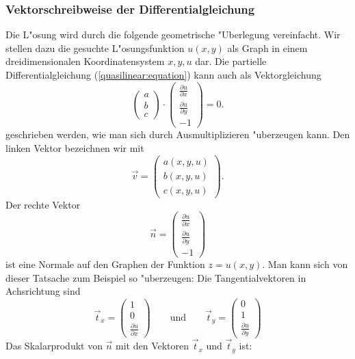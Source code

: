 \subsubsection{Vektorschreibweise der Differentialgleichung}
Die L"osung wird durch die folgende geometrische "Uberlegung vereinfacht.
Wir stellen dazu die gesuchte L"osungsfunktion $u(x,y)$ als Graph
in einem dreidimensionalen Koordinatensystem $x,y,u$ dar.
Die partielle Differentialgleichung (\ref{quasilinear:equation})
kann auch als Vektorgleichung
\begin{equation}
\begin{pmatrix}a\\b\\c\end{pmatrix}
\cdot
\begin{pmatrix}
\frac{\partial u}{\partial x}\\
\frac{\partial u}{\partial y}\\
-1
\end{pmatrix}
=0.
\label{quasilinear:vektorform}
\end{equation}
geschrieben werden, wie man sich durch Ausmultiplizieren "uberzeugen
kann.
Den linken Vektor bezeichnen wir mit
\[
\vec v=\begin{pmatrix}
a(x,y,u)\\
b(x,y,u)\\
c(x,y,u)
\end{pmatrix}.
\]
Der rechte Vektor
\[
\vec n=
\begin{pmatrix}
\frac{\partial u}{\partial x}\\
\frac{\partial u}{\partial y}\\
-1
\end{pmatrix}
\]
ist eine Normale auf den Graphen der Funktion
$z=u(x,y)$. Man kann sich von dieser Tatsache zum Beispiel so 
"uberzeugen: Die Tangentialvektoren in Achsrichtung sind
\[
\vec t_x
=
\begin{pmatrix}1\\0\\\frac{\partial u}{\partial x}\end{pmatrix}
\qquad
\text{und}
\qquad
\vec t_y
=
\begin{pmatrix}0\\1\\\frac{\partial u}{\partial y}\end{pmatrix}
\]
Das Skalarprodukt von $\vec n$ mit den Vektoren $\vec t_x$ und $\vec t_y$
ist:
